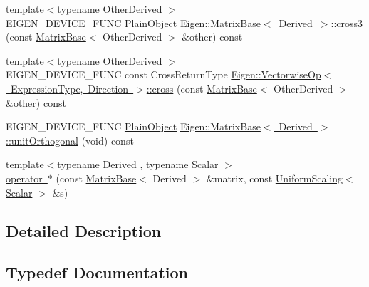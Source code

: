\begin{DoxyCompactItemize}
\item 
{\footnotesize template$<$typename Other\+Derived $>$ }\\E\+I\+G\+E\+N\+\_\+\+D\+E\+V\+I\+C\+E\+\_\+\+F\+U\+NC \mbox{\hyperlink{class_eigen_1_1_dense_base_aae45af9b5aca5a9caae98fd201f47cc4}{Plain\+Object}} \mbox{\hyperlink{group___geometry___module_gaf10988c8393785423ae68a5afdf83226}{Eigen\+::\+Matrix\+Base$<$ Derived $>$\+::cross3}} (const \mbox{\hyperlink{class_eigen_1_1_matrix_base}{Matrix\+Base}}$<$ Other\+Derived $>$ \&other) const
\item 
{\footnotesize template$<$typename Other\+Derived $>$ }\\E\+I\+G\+E\+N\+\_\+\+D\+E\+V\+I\+C\+E\+\_\+\+F\+U\+NC const Cross\+Return\+Type \mbox{\hyperlink{group___geometry___module_gab3efae0c028a63a41cccb94d978d1437}{Eigen\+::\+Vectorwise\+Op$<$ Expression\+Type, Direction $>$\+::cross}} (const \mbox{\hyperlink{class_eigen_1_1_matrix_base}{Matrix\+Base}}$<$ Other\+Derived $>$ \&other) const
\item 
E\+I\+G\+E\+N\+\_\+\+D\+E\+V\+I\+C\+E\+\_\+\+F\+U\+NC \mbox{\hyperlink{class_eigen_1_1_dense_base_aae45af9b5aca5a9caae98fd201f47cc4}{Plain\+Object}} \mbox{\hyperlink{group___geometry___module_ga2fd7a02d7bc4c339f0e97f12c09acb25}{Eigen\+::\+Matrix\+Base$<$ Derived $>$\+::unit\+Orthogonal}} (void) const
\item 
{\footnotesize template$<$typename Derived , typename Scalar $>$ }\\\mbox{\hyperlink{group___geometry___module_gae9451098be60e8ceda3c583d96e0aee1}{operator $\ast$}} (const \mbox{\hyperlink{class_eigen_1_1_matrix_base}{Matrix\+Base}}$<$ Derived $>$ \&matrix, const \mbox{\hyperlink{class_eigen_1_1_uniform_scaling}{Uniform\+Scaling}}$<$ \mbox{\hyperlink{class_eigen_1_1_uniform_scaling_a04c4339f58f1210c5d4d34b1bd7ae283}{Scalar}} $>$ \&s)
\end{DoxyCompactItemize}


\subsection{Detailed Description}


\subsection{Typedef Documentation}
\mbox{\label{group___geometry___module_gac1c9dbf666dc310b51253302a01136fe}} 
